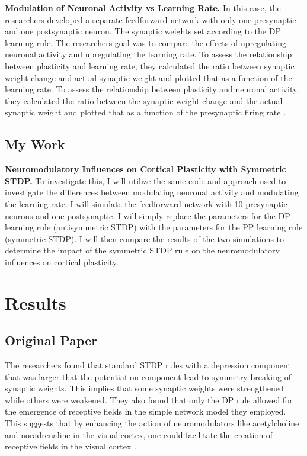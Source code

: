 \textbf{Modulation of Neuronal Activity vs Learning Rate.} In this case, the researchers developed a separate feedforward network with only one presynaptic and one postsynaptic neuron. The synaptic weights set according to the DP learning rule. The researchers goal was to compare the effects of upregulating neuronal activity and upregulating the learning rate. To assess the relationship between plasticity and learning rate, they calculated the ratio between synaptic weight change and actual synaptic weight and plotted that as a function of the learning rate. To assess the relationship between plasticity and neuronal activity, they calculated the ratio between the synaptic weight change and the actual synaptic weight and plotted that as a function of the presynaptic firing rate \cite{pedrosaRoleNeuromodulatorsCortical2017}. 

\subsection{My Work}

\textbf{Neuromodulatory Influences on Cortical Plasticity with Symmetric STDP.} To investigate this, I will utilize the same code and approach used to investigate the differences between modulating neuronal activity and modulating the learning rate. I will simulate the feedforward network with 10 presynaptic neurons and one postsynaptic. I will simply replace the parameters for the DP learning rule (antisymmetric STDP) with the parameters for the PP learning rule (symmetric STDP). I will then compare the results of the two simulations to determine the impact of the symmetric STDP rule on the neuromodulatory influences on cortical plasticity. 


\section{Results}

\subsection{Original Paper}

The researchers found that standard STDP rules with a depression component that was larger that the potentiation component lead to symmetry breaking of synaptic weights. This implies that some synaptic weights were strengthened while others were weakened. They also found that only the DP rule allowed for the emergence of receptive fields in the simple network model they employed. This suggests that by enhancing the action of neuromodulators like acetylcholine and noradrenaline in the visual cortex, one could facilitate the creation of receptive fields in the visual cortex \cite{pedrosaRoleNeuromodulatorsCortical2017}.

